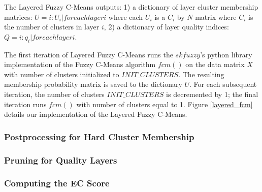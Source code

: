The Layered Fuzzy C-Means outputs: 1) a dictionary of layer cluster membership matrices:  $U = {i: U_{i} | for each layer i}$ where each $U_{i}$ is a $C_{i}$ by $N$ matrix where $C_{i}$ is the number of clusters in layer $i$, 2) a dictionary of layer quality indices: $Q = {i: q_{i} | for each layer i}$.

The first iteration of Layered Fuzzy C-Means runs the $skfuzzy$'s python library implementation of the Fuzzy C-Means algorithm $fcm()$ \cite{} on the data matrix $X$ with number of clusters initialized to $INIT\_CLUSTERS$. The resulting membership probability matrix is saved to the dictionary $U$. For each subsequent iteration, the number of clusters $INIT\_CLUSTERS$ is decremented by 1; the final iteration runs $fcm()$ with number of clusters equal to 1. Figure \ref{layered_fcm} details our implementation of the Layered Fuzzy C-Means.

\subsubsection{Postprocessing for Hard Cluster Membership}

\subsubsection{Pruning for Quality Layers}


\subsubsection{Computing the EC Score}

